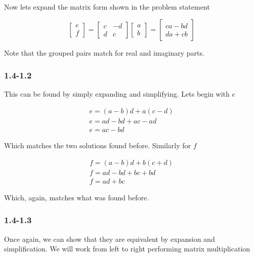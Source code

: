 \documentclass[11pt,a4paper,final]{article}
\begin{document}
Now lets expand the matrix form shown in the problem statement

\begin{equation*}
\begin{bmatrix} e \\ f \end{bmatrix} =
\begin{bmatrix} c & -d \\ d & c \end{bmatrix}
\begin{bmatrix} a \\ b \end{bmatrix} =
\begin{bmatrix}
ca - bd \\ da + cb
\end{bmatrix}
\end{equation*}

Note that the grouped pairs match for real and imaginary parts.

\subsubsection{1.4-1.2}
\label{sec:org7101378}
This can be found by simply expanding and simplifying. Lets begin with \(e\)

\begin{equation*}
\begin{array}{l}
e = (a-b)d + a(c-d) \\
e = ad - bd + ac - ad \\
e = ac - bd
\end{array}
\end{equation*}

Which matches the two solutions found before. Similarly for \(f\)

\begin{equation*}
\begin{array}{l}
f = (a-b)d + b(c+d) \\
f = ad - bd + bc + bd \\
f = ad + bc
\end{array}
\end{equation*}

Which, again, matches what was found before.

\subsubsection{1.4-1.3}
\label{sec:orgc88e360}
Once again, we can show that they are equivalent by expansion and simplification. We will work from left to right
performing matrix multiplication
\end{document}
